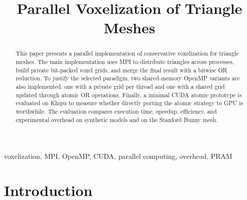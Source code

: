 \documentclass[conference]{IEEEtran}
\begin{document}
\title{Parallel Voxelization of Triangle Meshes}

\author{
  \and
  \and
}

\maketitle

\begin{abstract}
  This paper presents a parallel implementation of conservative voxelization for
  triangle meshes. The main implementation uses MPI to distribute triangles across
  processes, build private bit-packed voxel grids, and merge the final result with
  a bitwise OR reduction. To justify the selected paradigm, two shared-memory
  OpenMP variants are also implemented: one with a private grid per thread and one
  with a shared grid updated through atomic OR operations. Finally, a minimal
  CUDA atomic prototype is evaluated on Khipu to measure whether directly
  porting the atomic strategy to GPU is worthwhile. The evaluation compares
  execution time, speedup, efficiency, and experimental overhead on synthetic
  models and on the Stanford Bunny mesh.
\end{abstract}

\begin{IEEEkeywords}
  voxelization, MPI, OpenMP, CUDA, parallel computing, overhead, PRAM
\end{IEEEkeywords}

\section{Introduction}
\end{document}
